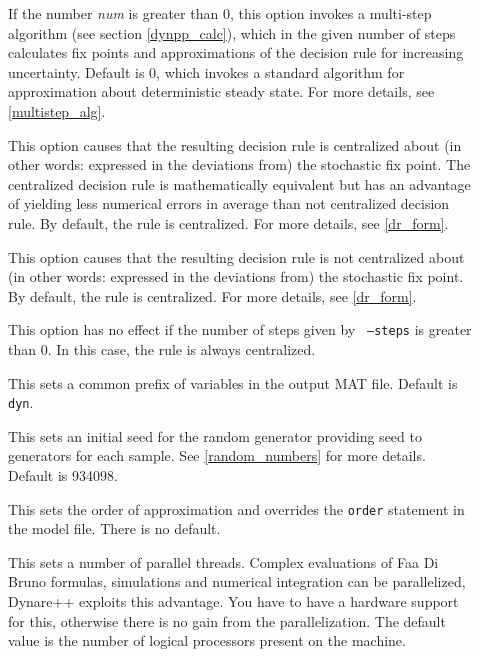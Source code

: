 \documentclass[10pt]{article}
\begin{document}
\begin{description}
\item[] If the number {\it num} is greater
than 0, this option invokes a multi-step algorithm (see section
\ref{dynpp_calc}), which in the given number of steps calculates fix
points and approximations of the decision rule for increasing
uncertainty. Default is 0, which invokes a standard algorithm for
approximation about deterministic steady state. For more details,
see \ref{multistep_alg}.

\item[] This option causes that the resulting
decision rule is centralized about (in other words: expressed in the
deviations from) the stochastic fix point. The centralized decision
rule is mathematically equivalent but has an advantage of yielding
less numerical errors in average than not centralized decision
rule. By default, the rule is centralized. For more details, see
\ref{dr_form}.

\item[] This option causes that the
resulting decision rule is not centralized about (in other words:
expressed in the deviations from) the stochastic fix point. By
default, the rule is centralized. For more details, see
\ref{dr_form}.

This option has no effect if the number of steps given by {\tt
--steps} is greater than 0. In this case, the rule is always
centralized.

\item[] This sets a common prefix of
variables in the output MAT file. Default is {\tt dyn}.

\item[] This sets an initial seed for the
random generator providing seed to generators for each sample. See
\ref{random_numbers} for more details. Default is 934098.

\item[] This sets the order of approximation
and overrides the {\tt order} statement in the model file. There is no
default.

\item[] This sets a number of parallel
threads. Complex evaluations of Faa Di Bruno formulas, simulations and
numerical integration can be parallelized, Dynare++ exploits this
advantage. You have to have a hardware support for this, otherwise
there is no gain from the parallelization. The default value is the number of
logical processors present on the machine.


\end{description}
\end{document}
